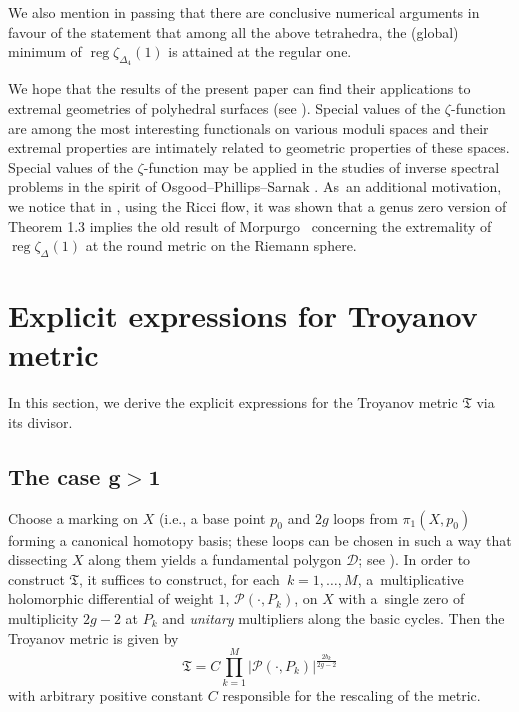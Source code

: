 \documentclass[pdftex]{sigma}
\numberwithin{equation}{section}
\theoremstyle{definition}
\begin{document}
We also mention in passing that there are conclusive numerical arguments in favour of the statement that among all the above tetrahedra, the (global) minimum of $\operatorname{reg}\zeta_{\Delta_4}(1)$ is attained at the regular one.

We hope that the results of the present paper can find their applications to extremal geometries of polyhedral surfaces (see \cite{Sarnak}). Special values of the $\zeta$-function are among the most interesting functionals on various moduli spaces and their extremal properties are intimately related to geometric properties of these spaces. Special values of the $\zeta$-function may be applied in the studies of inverse spectral problems in the spirit of Osgood--Phillips--Sarnak \cite{Zeld,OPS}. As~an additional motivation, we notice that in \cite{KokKorik}, using the Ricci flow, it was shown that a genus zero version of Theorem 1.3 implies the old result of Morpurgo~\cite{Mor} concerning the extremality of $\operatorname{reg} \zeta_\Delta(1)$ at the round metric on the Riemann sphere.

\section{Explicit expressions for Troyanov metric}
\label{Troyanov sec}
In this section, we derive the explicit expressions for the Troyanov metric $\mathfrak{T}$ via its divisor.

\subsection*{The case $\boldsymbol{g>1}$} Choose a marking on $X$ (i.e., a base point $p_0$ and $2g$ loops from
$\pi_1(X, p_0)$ forming a canonical homotopy basis; these loops can be chosen in such a way that dissecting $X$ along them yields a fundamental polygon $\mathcal{D}$; see \cite{Fay}). In order to construct $\mathfrak{T}$, it suffices to construct, for each~${k=1,\dots,M}$, a~multiplicative holomorphic differential of weight $1$, $\mathcal{P}(\cdot, P_k)$, on $X$ with a~single zero of multiplicity $2g-2$ at $P_k$ and {\it unitary} multipliers along the basic cycles.
Then the Troyanov metric is given by
\begin{equation}
\label{Troy 1}
\mathfrak{T}=C \prod_{k=1}^M|\mathcal{P}(\cdot, P_k)|^{\frac{2b_k}{2g-2}}\end{equation}
with arbitrary positive constant $C$ responsible for the rescaling of the metric.
\end{document}
